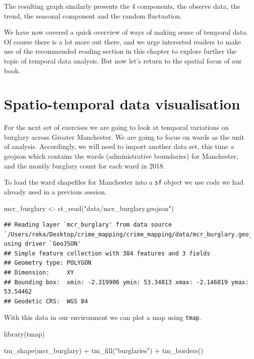 \documentclass[
]{book}
\makeatletter
\newenvironment{Shaded}{\begin{snugshade}}{\end{snugshade}}
\newcommand{\FunctionTok}[1]{\textcolor[rgb]{0,0,0}{#1}}
\newcommand{\NormalTok}[1]{#1}
\newcommand{\OtherTok}[1]{\textcolor[rgb]{0.37,0.37,0.37}{#1}}
\newcommand{\SpecialCharTok}[1]{\textcolor[rgb]{0,0,0}{#1}}
\newcommand{\StringTok}[1]{\textcolor[rgb]{0.5,0.5,0.5}{#1}}
\newenvironment{kframe}{%
\medskip{}
\setlength{\fboxsep}{.8em}
 \def\at@end@of@kframe{}%
 \ifinner\ifhmode%
  \def\at@end@of@kframe{\end{minipage}}%
  \begin{minipage}{\columnwidth}%
 \fi\fi%
 \def\FrameCommand##1{\hskip\@totalleftmargin \hskip-\fboxsep
 \colorbox{shadecolor}{##1}\hskip-\fboxsep
     \hskip-\linewidth \hskip-\@totalleftmargin \hskip\columnwidth}%
 \MakeFramed {\advance\hsize-\width
   \@totalleftmargin\z@ \linewidth\hsize
   \@setminipage}}%
 {\par\unskip\endMakeFramed%
 \at@end@of@kframe}
\renewenvironment{Shaded}{\begin{kframe}}{\end{kframe}}
\makeatother
\begin{document}
The resulting graph similarly presents the 4 components, the observe data, the trend, the seasonal component and the random fluctuation.

We have now covered a quick overview of ways of making sense of temporal data. Of course there is a lot more out there, and we urge interested readers to make use of the recommended reading section in this chapter to explore further the topic of temporal data analysis. But now let's return to the spatial focus of our book.

\hypertarget{spatio-temporal-data-visualisation}{%
\section{Spatio-temporal data visualisation}\label{spatio-temporal-data-visualisation}}

For the next set of exercises we are going to look at temporal variations on burglary across Greater Manchester. We are going to focus on wards as the unit of analysis. Accordingly, we will need to import another data set, this time a geojson which contains the wards (administrative boundaries) for Manchester, and the montly burglary count for each ward in 2018.

To load the ward shapefiles for Manchester into a \texttt{sf} object we use code we had already used in a previous session.

\begin{Shaded}
\begin{Highlighting}[]
\NormalTok{mcr\_burglary }\OtherTok{\textless{}{-}} \FunctionTok{st\_read}\NormalTok{(}\StringTok{"data/mcr\_burglary.geojson"}\NormalTok{)}
\end{Highlighting}
\end{Shaded}

\begin{verbatim}
## Reading layer `mcr_burglary' from data source `/Users/reka/Desktop/crime_mapping/crime_mapping/data/mcr_burglary.geojson' using driver `GeoJSON'
## Simple feature collection with 384 features and 3 fields
## Geometry type: POLYGON
## Dimension:     XY
## Bounding box:  xmin: -2.319906 ymin: 53.34013 xmax: -2.146819 ymax: 53.54462
## Geodetic CRS:  WGS 84
\end{verbatim}

With this data in our environment we can plot a map using \texttt{tmap}.

\begin{Shaded}
\begin{Highlighting}[]
\FunctionTok{library}\NormalTok{(tmap)}

\FunctionTok{tm\_shape}\NormalTok{(mcr\_burglary) }\SpecialCharTok{+} 
  \FunctionTok{tm\_fill}\NormalTok{(}\StringTok{"burglaries"}\NormalTok{) }\SpecialCharTok{+}
  \FunctionTok{tm\_borders}\NormalTok{() }
\end{Highlighting}
\end{Shaded}
\end{document}
